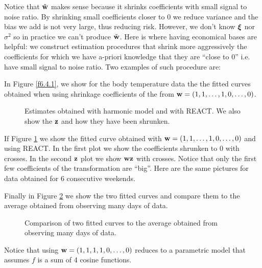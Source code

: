 Notice that $\tilde{{\mathbf w}}$ makes sense because it shrinks
coefficients with small signal to noise ratio. By shrinking small
coefficients closer to 0 we reduce variance and the bias we add is not
very large, thus reducing risk. However, we don't know $\mbox{\boldmath $\xi$\unboldmath}$ nor
$\sigma^2$ so in practice we can't produce $\tilde{{\mathbf w}}$. Here is
where having economical bases are helpful: we construct estimation
procedures that shrink more aggressively the coefficients for which we have
a-priori knowledge that they are ``close to 0'' i.e. have small signal
to noise ratio.  Two examples of such procedure are:

In Figure \ref{f6.4.1}, we show for the body temperature data the
the fitted curves obtained when using shrinkage
coefficients of the from ${\mathbf w} = 
(1,1,\dots,1,0,\dots,0)$.


\begin{figure}[htb]
\caption{\label{f6.4.2}Estimates obtained with harmonic model and with REACT. We
  also show the ${\mathbf z}$ and how they have been shrunken.}
\begin{center}
\end{center}
\end{figure}

If Figure \ref{f6.4.2} we show the fitted curve obtained with ${\mathbf w} =
(1,1,\dots,1,0,\dots,0)$ and using REACT. 
In the first plot we show the coefficients shrunken to 0
with crosses. In the second ${\mathbf z}$ plot we show ${\mathbf w} {\mathbf z}$ with
crosses. Notice that only the first few coefficients of the
transformation are ``big''. Here are the same pictures for data
obtained for 6 consecutive weekends.

Finally in Figure \ref{f6.4.3} we show the two fitted curves and
compare them to the average obtained from observing many days of data.

\begin{figure}[htb]
\caption{\label{f6.4.3} Comparison of two fitted curves to the 
average obtained from observing many days of data.}

\begin{center}
\end{center}
\end{figure}



Notice that using ${\mathbf w} = (1,1,1,1,0,\dots,0)$ reduces to a parametric
model that assumes $f$ is a sum of 4 cosine functions. 

